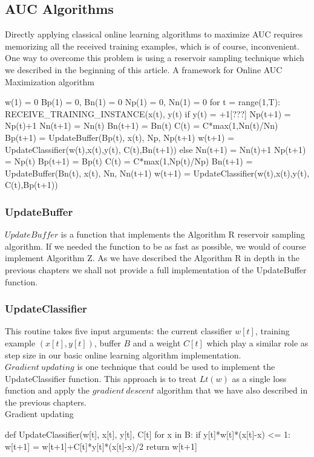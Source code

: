 \documentclass[journal]{IEEEtran/IEEEtran}
\begin{document}
\subsection{AUC Algorithms}
Directly applying classical online learning algorithms to maximize AUC requires memorizing all the received training examples, which is of course, inconvenient. One way to overcome this problem is using a reservoir sampling technique which we described in the beginning of this article. 
A framework for Online AUC Maximization algorithm
\begin{code}
w(1) = 0
Bp(1) = 0, Bn(1) = 0
Np(1) = 0, Nn(1) = 0
for t = range(1,T):
  RECEIVE_TRAINING_INSTANCE(x(t), y(t)
  if y(t) = +1[???]
    Np(t+1) = Np(t)+1
    Nn(t+1) = Nn(t)
    Bn(t+1) = Bn(t)
    C(t) = C*max(1,Nn(t)/Nn)
    Bp(t+1) = 
      UpdateBuffer(Bp(t), x(t), Np, Np(t+1)
    w(t+1)  = 
      UpdateClassifier(w(t),x(t),y(t),
                       C(t),Bn(t+1))
  else
    Nn(t+1) = Nn(t)+1
    Np(t+1) = Np(t)
    Bp(t+1) = Bp(t)
    C(t) = C*max(1,Np(t)/Np)
    Bn(t+1) = 
      UpdateBuffer(Bn(t), x(t), Nn, Nn(t+1)
    w(t+1)  = 
      UpdateClassifier(w(t),x(t),y(t),
                       C(t),Bp(t+1))
\end{code}
\subsubsection*{UpdateBuffer}
$UpdateBuffer$ is a function that implements the Algorithm R reservoir sampling algorithm. If we needed the function to be as fast as possible, we would of course implement Algorithm Z. As we have described the Algorithm R in depth in the previous chapters we shall not provide a full implementation of the UpdateBuffer function.

\subsubsection*{UpdateClassifier} 
This routine takes five input arguments: the current classifier $w[t]$, training example $(x[t], y[t])$, buffer $B$ and a weight $C[t]$ which play a similar role as step size in our basic online learning algorithm implementation. $Gradient\ updating$ is one technique that could be used to implement the UpdateClassifier function. This approach is to treat $Lt(w)$ as a single loss function and apply the $gradient\ descent$ algorithm that we have also described in the previous chapters.\\
Gradient updating
\begin{code}
def UpdateClassifier(w[t], x[t], y[t], C[t]
  for x in B:
    if y[t]*w[t]*(x[t]-x) <= 1:
      w[t+1] = w[t+1]+C[t]*y[t]*(x[t]-x)/2
  return w[t+1]
\end{code}
\end{document}
